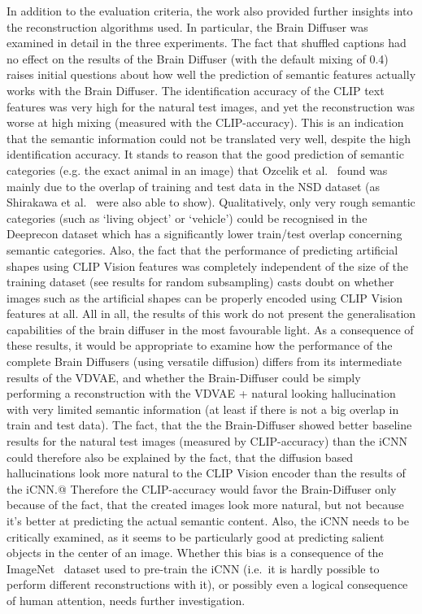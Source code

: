 In addition to the evaluation criteria, the work also provided further insights into the reconstruction algorithms used. In particular, the Brain Diffuser was examined in detail in the three experiments. The fact that shuffled captions had no effect on the results of the Brain Diffuser (with the default mixing of 0.4) raises initial questions about how well the prediction of semantic features actually works with the Brain Diffuser. The identification accuracy of the CLIP text features was very high for the natural test images, and yet the reconstruction was worse at high mixing (measured with the CLIP-accuracy). This is an indication that the semantic information could not be translated very well, despite the high identification accuracy. It stands to reason that the good prediction of semantic categories (e.g. the exact animal in an image) that Ozcelik et al.~\cite{ozcelikNaturalSceneReconstruction2023} found was mainly due to the overlap of training and test data in the NSD dataset (as Shirakawa et al.~\cite{shirakawaSpuriousReconstructionBrain2024} were also able to show). Qualitatively, only very rough semantic categories (such as `living object' or `vehicle') could be recognised in the Deeprecon dataset which has a significantly lower train/test overlap concerning semantic categories. Also, the fact that the performance of predicting artificial shapes using CLIP Vision features was completely independent of the size of the training dataset (see results for random subsampling) casts doubt on whether images such as the artificial shapes can be properly encoded using CLIP Vision features at all. All in all, the results of this work do not present the generalisation capabilities of the brain diffuser in the most favourable light. As a consequence of these results, it would be appropriate to examine how the performance of the complete Brain Diffusers (using versatile diffusion) differs from its intermediate results of the VDVAE, and whether the Brain-Diffuser could be simply performing a reconstruction with the VDVAE + natural looking hallucination with very limited semantic information (at least if there is not a big overlap in train and test data). The fact, that the the Brain-Diffuser showed better baseline results for the natural test images (measured by CLIP-accuracy) than the iCNN could therefore also be explained by the fact, that the diffusion based hallucinations look more natural to the CLIP Vision encoder than the results of the iCNN.@ Therefore the CLIP-accuracy would favor the Brain-Diffuser only because of the fact, that the created images look more natural, but not because it's better at predicting the actual semantic content. Also, the iCNN needs to be critically examined, as it seems to be particularly good at predicting salient objects in the center of an image. Whether this bias is a consequence of the ImageNet~\cite{dengImageNetLargescaleHierarchical2009} dataset used to pre-train the iCNN (i.e.\ it is hardly possible to perform different reconstructions with it), or possibly even a logical consequence of human attention, needs further investigation.


